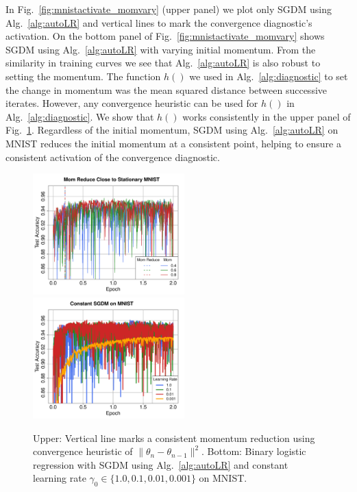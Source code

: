 \documentclass[conference]{IEEEtran}
\begin{document}
In Fig.~\ref{fig:mnistactivate_momvary} (upper panel) we plot only SGDM using Alg.~\ref{alg:autoLR} and vertical lines to mark the convergence diagnostic's activation.
On the bottom panel of Fig.~\ref{fig:mnistactivate_momvary} shows SGDM using Alg.~\ref{alg:autoLR} with varying initial momentum.
From the similarity in training curves we see that Alg.~\ref{alg:autoLR} is also robust to setting the momentum.
The function $h()$ we used in Alg.~\ref{alg:diagnostic} to set the change in momentum was the mean squared distance between successive iterates. 
However, any convergence heuristic can be used for $h()$ in Alg.~\ref{alg:diagnostic}.
We show that $h()$ works consistently in the upper panel of Fig.~\ref{fig:momred_constlr}.
Regardless of the initial momentum, SGDM using Alg.~\ref{alg:autoLR} on MNIST reduces the initial momentum at a consistent point, helping to ensure a consistent activation of the convergence diagnostic.


\begin{figure}[h]
\begin{center}
  \includegraphics[width=2.3in]{fig/RFig4_CheckStat.pdf}\hspace{-0.12in}
\includegraphics[width=2.3in]{fig/RFig5_Const.pdf}
\end{center}
\vspace{-0.17in}
  \caption{Upper: Vertical line marks a consistent momentum reduction using convergence heuristic of $\| \theta_n - \theta_{n-1} \|^2$.
  Bottom: Binary logistic regression with SGDM using Alg.~\ref{alg:autoLR} and constant learning rate $\gamma_0 \in \{1.0, 0.1, 0.01, 0.001\}$ on MNIST.
  }
\label{fig:momred_constlr}\vspace{-0.15in}
\end{figure}
\end{document}
